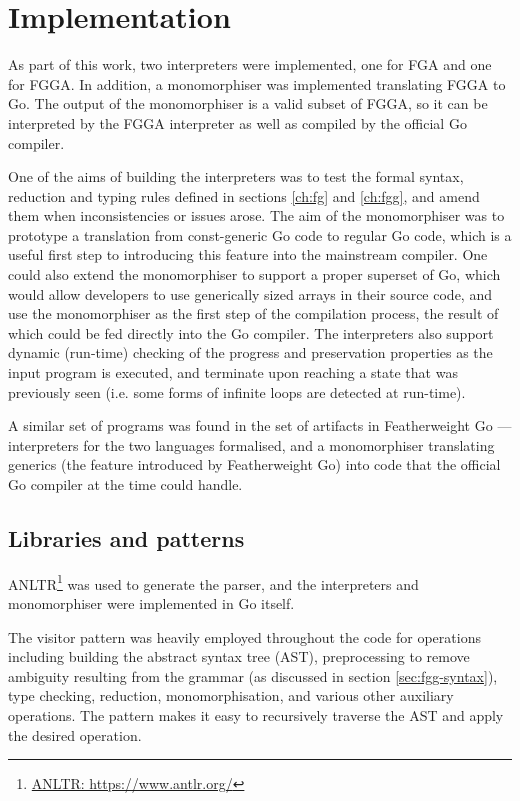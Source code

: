 \section{Implementation}
\label{ch:interpter-impl}

As part of this work, two interpreters were implemented, one for FGA and one for
FGGA. In addition, a monomorphiser was implemented translating FGGA to Go. The
output of the monomorphiser is a valid subset of FGGA, so it can be interpreted
by the FGGA interpreter as well as compiled by the official Go compiler.

One of the aims of building the interpreters was to test the formal syntax,
reduction and typing rules defined in sections \ref{ch:fg} and \ref{ch:fgg}, and
amend them when inconsistencies or issues arose. The aim of the monomorphiser
was to prototype a translation from const-generic Go code to regular Go code,
which is a useful first step to introducing this feature into the mainstream
compiler. One could also extend the monomorphiser to support a proper superset
of Go, which would allow developers to use generically sized arrays in their
source code, and use the monomorphiser as the first step of the compilation
process, the result of which could be fed directly into the Go compiler. The
interpreters also support dynamic (run-time) checking of the progress and
preservation properties as the input program is executed, and terminate upon
reaching a state that was previously seen (i.e. some forms of infinite loops are
detected at run-time).

A similar set of programs was found in the set of artifacts in Featherweight Go
\autocite{fg} --- interpreters for the two languages formalised, and a
monomorphiser translating generics (the feature introduced by Featherweight Go)
into code that the official Go compiler at the time could handle.

\subsection{Libraries and patterns}

ANLTR\footnote{\href{https://www.antlr.org/}{ANLTR: https://www.antlr.org/}} was
used to generate the parser, and the interpreters and monomorphiser were
implemented in Go itself.

The visitor pattern was heavily employed throughout the code for operations
including building the abstract syntax tree (AST), preprocessing to remove
ambiguity resulting from the grammar (as discussed in section
\ref{sec:fgg-syntax}), type checking, reduction, monomorphisation, and various
other auxiliary operations. The pattern makes it easy to recursively traverse
the AST and apply the desired operation.

